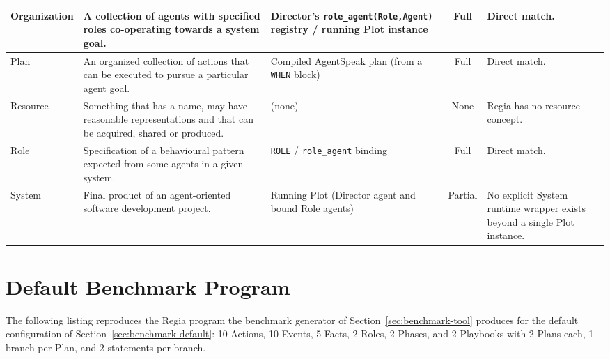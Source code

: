 \begin{longtable}{|p{}|p{}|p{}|c|p{}|}
Organization &
A collection of agents with specified roles co-operating towards a system goal. &
Director's \lstinline|role_agent(Role,Agent)| registry / running Plot instance &
Full &
Direct match. \\
\hline

Plan &
An organized collection of actions that can be executed to pursue a particular agent goal. &
Compiled AgentSpeak plan (from a \lstinline|WHEN| block) &
Full &
Direct match. \\
\hline

Resource &
Something that has a name, may have reasonable representations and that can be acquired, shared or produced. &
(none) &
None &
Regia has no resource concept. \\
\hline

Role &
Specification of a behavioural pattern expected from some agents in a given system. &
\lstinline|ROLE| / \lstinline|role_agent| binding &
Full &
Direct match. \\
\hline

System &
Final product of an agent-oriented software development project. &
Running Plot (Director agent and bound Role agents) &
Partial &
No explicit System runtime wrapper exists beyond a single Plot instance. \\
\hline

\end{longtable}


\section{Default Benchmark Program}
\label{app:default-config}

The following listing reproduces the Regia program the benchmark generator of Section~\ref{sec:benchmark-tool} produces for the default configuration of Section~\ref{sec:benchmark-default}: 10 Actions, 10 Events, 5 Facts, 2 Roles, 2 Phases, and 2 Playbooks with 2 Plans each, 1 branch per Plan, and 2 statements per branch.

